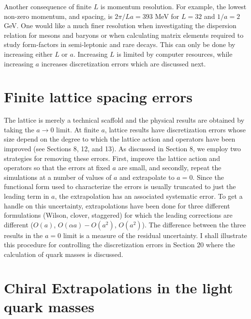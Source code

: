 Another consequence of finite $L$ is momentum resolution. For example, the lowest non-zero momentum, and spacing, is $2\pi/La = 393$ MeV for $L = 32$ and $1/a = 2$ GeV. One would like a much finer resolution when investigating the dispersion relation for mesons and baryons or when calculating matrix elements required to study form-factors in semi-leptonic and rare decays. This can only be done by increasing either $L$ or $a$. Increasing $L$ is limited by computer resources, while increasing $a$ increases discretization errors which are discussed next.

\section{Finite lattice spacing errors}

The lattice is merely a technical scaffold and the physical results are obtained by taking the $a \to 0$ limit. At finite $a$, lattice results have discretization errors whose size depend on the degree to which the lattice action and operators have been improved (see Sections 8, 12, and 13). As discussed in Section 8, we employ two strategies for removing these errors. First, improve the lattice action and operators so that the errors at fixed $a$ are small, and secondly, repeat the simulations at a number of values of $a$ and extrapolate to $a = 0$. Since the functional form used to characterize the errors is usually truncated to just the leading term in $a$, the extrapolation has an associated systematic error. To get a handle on this uncertainty, extrapolations have been done for three different formulations (Wilson, clover, staggered) for which the leading corrections are different ($O(a)$, $O(\alpha a) - O(a^2)$, $O(a^2)$). The difference between the three results in the $a = 0$ limit is a measure of the residual uncertainty. I shall illustrate this procedure for controlling the discretization errors in Section 20 where the calculation of quark masses is discussed.

\section{Chiral Extrapolations in the light quark masses}

